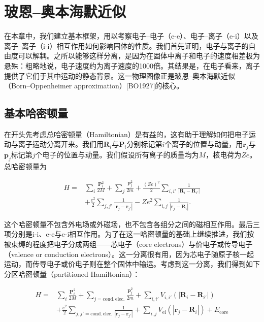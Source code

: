 \chapter{玻恩–奥本海默近似}

在本章中，我们建立基本框架，用以考察电子–电子（e-e）、电子–离子（e-i）以及离子–离子（i-i）相互作用如何影响固体的性质。我们首先证明，电子与离子的自由度可以解耦。之所以能够这样分离，是因为在固体中离子和电子的速度相差极为悬殊：粗略地说，电子速度约为离子速度的1000倍。其结果是，在电子看来，离子提供了它们于其中运动的静态背景。这一物理图像正是玻恩–奥本海默近似（Born–Oppenheimer approximation）[BO1927]的核心。

\section{基本哈密顿量}

在开头先考虑总哈密顿量（Hamiltonian）是有益的，这有助于理解如何把电子运动与离子运动分离开来。我们用$\mathbf R_i$与$\mathbf P_i$分别标记第$i$个离子的位置与动量，用$\mathbf r_j$与$\mathbf p_j$标记第$j$个电子的位置与动量。我们假设所有离子的质量均为$M$，核电荷为$Ze$。总哈密顿量为

\begin{equation*}
\begin{aligned}
H = {} & \sum_i \frac{\mathbf P_i^2}{2M} + \sum_j \frac{\mathbf p_j^2}{2m} + \frac{(Ze)^2}{2}\sum_{i,i'} \frac{1}{|\mathbf R_i - \mathbf R_{i'}|} \\
& + \frac{e^2}{2}\sum_{j,j'} \frac{1}{|\mathbf r_j - \mathbf r_{j'}|} - Ze^2\sum_{i,j} \frac{1}{|\mathbf r_j - \mathbf R_i|}.
\end{aligned}
\tag{3.1}
\end{equation*}

这个哈密顿量不包含外电场或外磁场，也不包含各组分之间的磁相互作用。最后三项分别是i-i、e-e与e-i相互作用。为了在这一哈密顿量的基础上继续推进，我们按被束缚的程度把电子分成两组——芯电子（core electrons）与价电子或传导电子（valence or conduction electrons）。这一分离很有用，因为芯电子随原子核一起运动，而传导电子或价电子则在整个固体中输运。考虑到这一分离，我们得到如下分区哈密顿量（partitioned Hamiltonian）：

\begin{equation*}
\begin{aligned}
H = {} & \sum_i \frac{\mathbf P_i^2}{2M} + \sum_{j=\mathrm{cond.\,elec.}} \frac{\mathbf p_j^2}{2m} + \sum_{i,i'} V_{i,i'}(|\mathbf R_i - \mathbf R_{i'}|) \\
& + \frac{e^2}{2}\sum_{j,j'=\mathrm{cond.\,elec.}} \frac{1}{|\mathbf r_j - \mathbf r_{j'}|} + \sum_{i,j} V_{\mathrm{ei}}(|\mathbf r_j - \mathbf R_i|) + E_{\mathrm{core}}
\end{aligned}
\tag{3.2}
\end{equation*}

